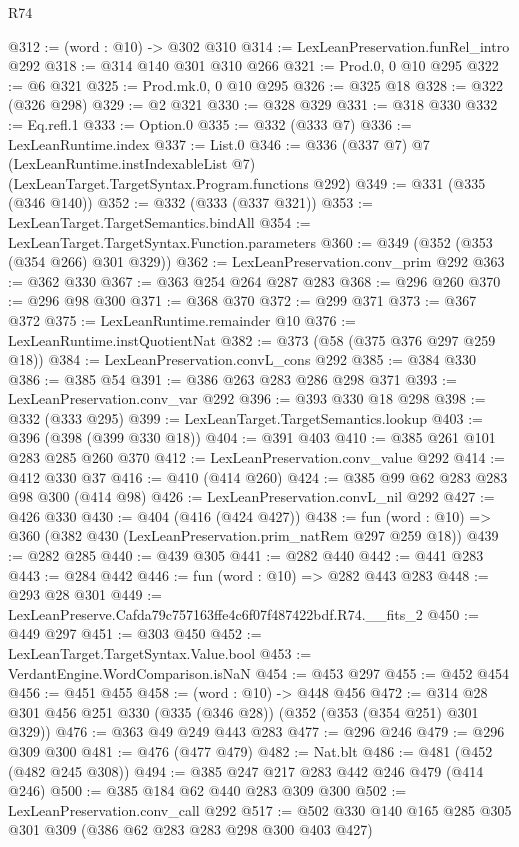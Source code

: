\begin{lexlean}{R74}
\begin{coremodule}
@312 := (word : @10) -> @302 @310
@314 := LexLeanPreservation.funRel_intro @292
@318 := @314 @140 @301 @310 @266
@321 := Prod.{0, 0} @10 @295
@322 := @6 @321
@325 := Prod.mk.{0, 0} @10 @295
@326 := @325 @18
@328 := @322 (@326 @298)
@329 := @2 @321
@330 := @328 @329
@331 := @318 @330
@332 := Eq.refl.{1}
@333 := Option.{0}
@335 := @332 (@333 @7)
@336 := LexLeanRuntime.index
@337 := List.{0}
@346 := @336
    (@337 @7)
    @7
    (LexLeanRuntime.instIndexableList @7)
    (LexLeanTarget.TargetSyntax.Program.functions @292)
@349 := @331 (@335 (@346 @140))
@352 := @332 (@333 (@337 @321))
@353 := LexLeanTarget.TargetSemantics.bindAll
@354 := LexLeanTarget.TargetSyntax.Function.parameters
@360 := @349 (@352 (@353 (@354 @266) @301 @329))
@362 := LexLeanPreservation.conv_prim @292
@363 := @362 @330
@367 := @363 @254 @264 @287 @283
@368 := @296 @260
@370 := @296 @98 @300
@371 := @368 @370
@372 := @299 @371
@373 := @367 @372
@375 := LexLeanRuntime.remainder @10
@376 := LexLeanRuntime.instQuotientNat
@382 := @373 (@58 (@375 @376 @297 @259 @18))
@384 := LexLeanPreservation.convL_cons @292
@385 := @384 @330
@386 := @385 @54
@391 := @386 @263 @283 @286 @298 @371
@393 := LexLeanPreservation.conv_var @292
@396 := @393 @330 @18 @298
@398 := @332 (@333 @295)
@399 := LexLeanTarget.TargetSemantics.lookup
@403 := @396 (@398 (@399 @330 @18))
@404 := @391 @403
@410 := @385 @261 @101 @283 @285 @260 @370
@412 := LexLeanPreservation.conv_value @292
@414 := @412 @330 @37
@416 := @410 (@414 @260)
@424 := @385 @99 @62 @283 @283 @98 @300 (@414 @98)
@426 := LexLeanPreservation.convL_nil @292
@427 := @426 @330
@430 := @404 (@416 (@424 @427))
@438 := fun (word : @10) => @360 (@382 @430 (LexLeanPreservation.prim_natRem @297 @259 @18))
@439 := @282 @285
@440 := @439 @305
@441 := @282 @440
@442 := @441 @283
@443 := @284 @442
@446 := fun (word : @10) => @282 @443 @283
@448 := @293 @28 @301
@449 := LexLeanPreserve.Cafda79c757163ffe4c6f07f487422bdf.R74.__fits_2
@450 := @449 @297
@451 := @303 @450
@452 := LexLeanTarget.TargetSyntax.Value.bool
@453 := VerdantEngine.WordComparison.isNaN
@454 := @453 @297
@455 := @452 @454
@456 := @451 @455
@458 := (word : @10) -> @448 @456
@472 := @314 @28 @301 @456 @251 @330 (@335 (@346 @28)) (@352 (@353 (@354 @251) @301 @329))
@476 := @363 @49 @249 @443 @283
@477 := @296 @246
@479 := @296 @309 @300
@481 := @476 (@477 @479)
@482 := Nat.blt
@486 := @481 (@452 (@482 @245 @308))
@494 := @385 @247 @217 @283 @442 @246 @479 (@414 @246)
@500 := @385 @184 @62 @440 @283 @309 @300
@502 := LexLeanPreservation.conv_call @292
@517 := @502 @330 @140 @165 @285 @305 @301 @309 (@386 @62 @283 @283 @298 @300 @403 @427)

\end{coremodule}
\end{lexlean}
